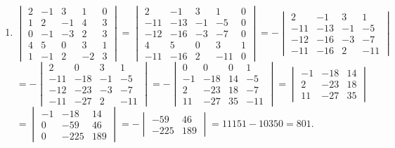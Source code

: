 	\paragraph{} %
		\begin{enumerate}
			\item %
			      $\begin{vmatrix}
					      2 & -1 & 3  & 1  & 0 \\
					      1 & 2  & -1 & 4  & 3 \\
					      0 & -1 & -3 & 2  & 3 \\
					      4 & 5  & 0  & 3  & 1 \\
					      1 & -1 & 2  & -2 & 3
				      \end{vmatrix} = \begin{vmatrix}
					      2   & -1  & 3  & 1   & 0 \\
					      -11 & -13 & -1 & -5  & 0 \\
					      -12 & -16 & -3 & -7  & 0 \\
					      4   & 5   & 0  & 3   & 1 \\
					      -11 & -16 & 2  & -11 & 0
				      \end{vmatrix} = -\begin{vmatrix}
					      2   & -1  & 3  & 1   \\
					      -11 & -13 & -1 & -5  \\
					      -12 & -16 & -3 & -7  \\
					      -11 & -16 & 2  & -11
				      \end{vmatrix}$
			      $= -\begin{vmatrix}
					      2   & 0   & 3  & 1   \\
					      -11 & -18 & -1 & -5  \\
					      -12 & -23 & -3 & -7  \\
					      -11 & -27 & 2  & -11
				      \end{vmatrix} = -\begin{vmatrix}
					      0  & 0   & 0  & 1   \\
					      -1 & -18 & 14 & -5  \\
					      2  & -23 & 18 & -7  \\
					      11 & -27 & 35 & -11
				      \end{vmatrix} = \begin{vmatrix}
					      -1 & -18 & 14 \\
					      2  & -23 & 18 \\
					      11 & -27 & 35
				      \end{vmatrix}$
			      $= \begin{vmatrix}
					      -1 & -18  & 14  \\
					      0  & -59  & 46  \\
					      0  & -225 & 189
				      \end{vmatrix} = -\begin{vmatrix}
					      -59  & 46  \\
					      -225 & 189
				      \end{vmatrix} = 11151 - 10350 = 801$.


\end{enumerate}
